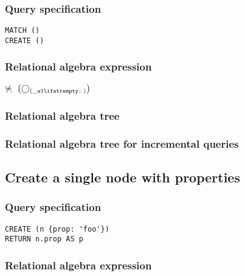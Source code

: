\subsubsection*{Query specification}

\begin{lstlisting}
MATCH ()
CREATE ()
\end{lstlisting}

\subsubsection*{Relational algebra expression}

$\alldifferent{} \left(\getvertices{\_e1}{}\right)$

\subsubsection*{Relational algebra tree}


\subsubsection*{Relational algebra tree for incremental queries}


\subsection{Create a single node with properties}

\subsubsection*{Query specification}

\begin{lstlisting}
CREATE (n {prop: 'foo'})
RETURN n.prop AS p
\end{lstlisting}

\subsubsection*{Relational algebra expression}

